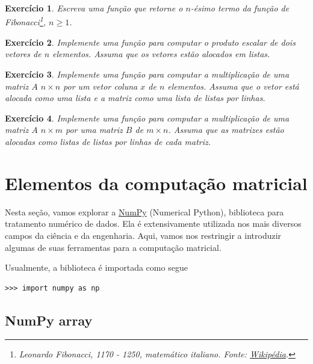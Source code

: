\documentclass[12pt]{article}
\newtheorem{exr}{Exercício}[section]
\begin{document}
\begin{exr}
  Escreva uma função que retorne o $n$-ésimo termo da função de Fibonacci\footnote{Leonardo Fibonacci, 1170 - 1250, matemático italiano. Fonte: \href{https://pt.wikipedia.org/wiki/Leonardo\_Fibonacci}{Wikipédia}.}, $n\geq 1$. 
\end{exr}

\begin{exr}
  Implemente uma função para computar o produto escalar de dois vetores de $n$ elementos. Assuma que os vetores estão alocados em listas.
\end{exr}

\begin{exr}
  Implemente uma função para computar a multiplicação de uma matriz $A$ $n\times n$ por um vetor coluna $x$ de $n$ elementos. Assuma que o vetor está alocada como uma lista e a matriz como uma lista de listas por linhas.
\end{exr}

\begin{exr}
  Implemente uma função para computar a multiplicação de uma matriz $A$ $n\times m$ por uma matriz $B$ de $m\times n$. Assuma que as matrizes estão alocadas como listas de listas por linhas de cada matriz.
\end{exr}

\section{Elementos da computação matricial}\label{sec_mat}

Nesta seção, vamos explorar a \href{https://numpy.org/}{NumPy} (Numerical Python), biblioteca para tratamento numérico de dados. Ela é extensivamente utilizada nos mais diversos campos da ciência e da engenharia. Aqui, vamos nos restringir a introduzir algumas de suas ferramentas para a computação matricial.

Usualmente, a biblioteca é importada como segue
\begin{lstlisting}
>>> import numpy as np
\end{lstlisting}

\subsection{NumPy array}
\end{document}
